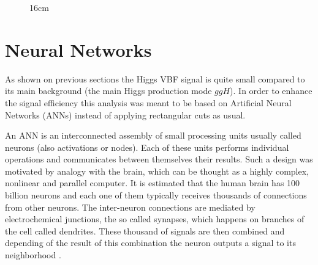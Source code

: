 \begin{figure}[hbtp]{16cm}
	\label{fig:control_plots}		
\end{figure}


\chapter{Neural Networks}
\label{sec:neural_networks}
As shown on previous sections the Higgs VBF signal is quite small compared to its main background (the main Higgs production mode $ggH$). In order to enhance the signal efficiency this analysis was meant to be based on Artificial Neural Networks (ANNs) instead of applying rectangular cuts as usual. 

An ANN is an interconnected assembly of small processing units usually called neurons (also activations or nodes). Each of these units performs individual operations and communicates between themselves their results. Such a design was motivated by analogy with
the brain, which can be thought as a highly complex, nonlinear and parallel computer. It is estimated that the human brain has 100 billion neurons and each one of them typically receives thousands of connections from other neurons. The inter-neuron connections are mediated by electrochemical junctions, the so called synapses, which happens on branches of the cell called dendrites. These thousand of signals are then combined and depending of the result of this combination the neuron outputs a signal to its neighborhood \cite{bib:SimonHaykin,bib:KevinGurney}.


